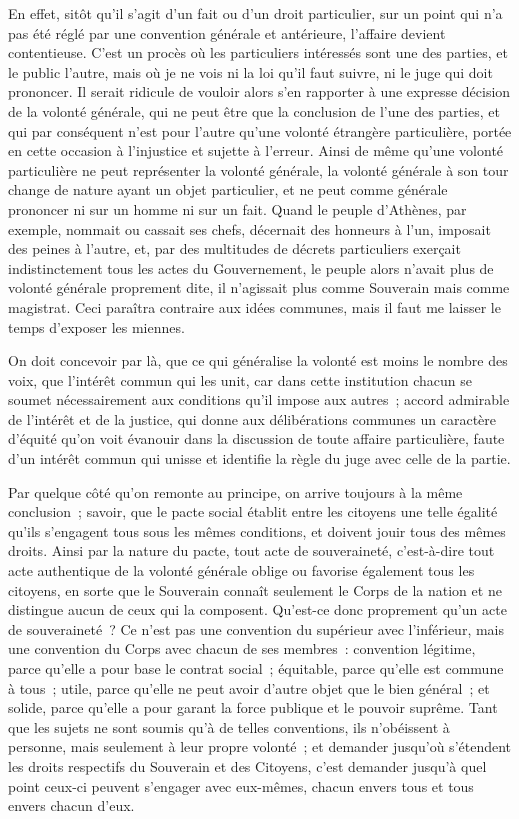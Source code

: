\documentclass[french,twoside]{book} %
\begin{document}
En effet, sitôt qu’il s’agit d’un fait ou d’un droit particulier, sur un point qui n’a pas été réglé par une convention générale et antérieure, l’affaire devient contentieuse. C’est un procès où les particuliers intéressés sont une des parties, et le public l’autre, mais où je ne vois ni la loi qu’il faut suivre, ni le juge qui doit prononcer. Il serait ridicule de vouloir alors s’en rapporter à une expresse décision de la volonté générale, qui ne peut être que la conclusion de l’une des parties, et qui par conséquent n’est pour l’autre qu’une volonté étrangère particulière, portée en cette occasion à l’injustice et sujette à l’erreur. Ainsi de même qu’une volonté particulière ne peut représenter la volonté générale, la volonté générale à son tour change de nature ayant un objet particulier, et ne peut comme générale prononcer ni sur un homme ni sur un fait. Quand le peuple d’Athènes, par exemple, nommait ou cassait ses chefs, décernait des honneurs à l’un, imposait des peines à l’autre, et, par des multitudes de décrets particuliers exerçait indistinctement tous les actes du Gouvernement, le peuple alors n’avait plus de volonté générale proprement dite, il n’agissait plus comme Souverain mais comme magistrat. Ceci paraîtra contraire aux idées communes, mais il faut me laisser le temps d’exposer les miennes.\par
On doit concevoir par là, que ce qui généralise la volonté est moins le nombre des voix, que l’intérêt commun qui les unit, car dans cette institution chacun se soumet nécessairement aux conditions qu’il impose aux autres ; accord admirable de l’intérêt et de la justice, qui donne aux délibérations communes un caractère d’équité qu’on voit évanouir dans la discussion de toute affaire particulière, faute d’un intérêt commun qui unisse et identifie la règle du juge avec celle de la partie.\par
Par quelque côté qu’on remonte au principe, on arrive toujours à la même conclusion ; savoir, que le pacte social établit entre les citoyens une telle égalité qu’ils s’engagent tous sous les mêmes conditions, et doivent jouir tous des mêmes droits. Ainsi par la nature du pacte, tout acte de souveraineté, c’est-à-dire tout acte authentique de la volonté générale oblige ou favorise également tous les citoyens, en sorte que le Souverain connaît seulement le Corps de la nation et ne distingue aucun de ceux qui la composent. Qu’est-ce donc proprement qu’un acte de souveraineté ? Ce n’est pas une convention du supérieur avec l’inférieur, mais une convention du Corps avec chacun de ses membres : convention légitime, parce qu’elle a pour base le contrat social ; équitable, parce qu’elle est commune à tous ; utile, parce qu’elle ne peut avoir d’autre objet que le bien général ; et solide, parce qu’elle a pour garant la force publique et le pouvoir suprême. Tant que les sujets ne sont soumis qu’à de telles conventions, ils n’obéissent à personne, mais seulement à leur propre volonté ; et demander jusqu’où s’étendent les droits respectifs du Souverain et des Citoyens, c’est demander jusqu’à quel point ceux-ci peuvent s’engager avec eux-mêmes, chacun envers tous et tous envers chacun d’eux.\par
\end{document}
